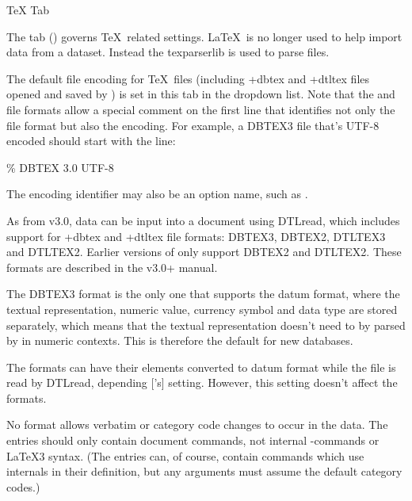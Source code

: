
 {%
 }
 {TeX Tab}


The  tab () governs
\TeX\ related settings.
\LaTeX\ is no longer used to help  import data from 
a  dataset. Instead the \gls{texparserlib} is used
to parse  files.

The default file encoding for \TeX\ files (including \ext+{dbtex}
and \ext+{dtltex} files opened and saved by ) is set
in this tab in the  dropdown list.
Note that the  and  file formats allow a
special comment on the first line that identifies not only the file
format but also the encoding. For example, a \gls{DBTEX3} file that's
UTF-8 encoded should start with the line:
\begin{codebox}
\% DBTEX 3.0 UTF-8
\end{codebox}
The encoding identifier may also be an  option name,
such as .

As from  v3.0, data can be input into a document using
\gls{DTLread}, which includes support for \ext+{dbtex} and
\ext+{dtltex} file formats: \gls{DBTEX3}, \gls{DBTEX2}, \gls{DTLTEX3}
and \gls{DTLTEX2}. Earlier versions of  only
support \gls{DBTEX2} and \gls{DTLTEX2}. These formats are described in
the  v3.0+ manual.

The \gls{DBTEX3} format is the only one that supports the datum
format, where the textual representation, numeric value, currency
symbol and data type are stored separately, which means that the textual
representation doesn't need to by parsed by  in
numeric contexts. This is therefore the default for new databases.

The  formats can have their elements converted to datum
format while the file is read by \gls{DTLread}, depending
['s]  setting. However, this setting
doesn't affect the  formats.

\begin{important}
No format allows verbatim or category code changes to occur in the
data. The entries should only contain document commands, not
internal -commands or \LaTeX3 syntax. (The entries can, of
course, contain commands which use internals in their definition,
but any arguments must assume the default category codes.)
\end{important}

